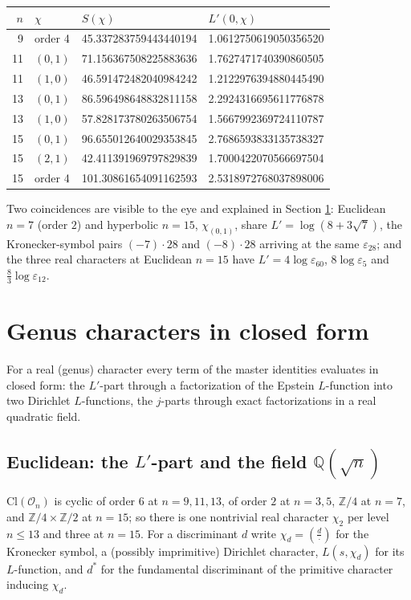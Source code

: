 \documentclass[11pt]{amsart}
\numberwithin{equation}{section}
\theoremstyle{plain}
\theoremstyle{definition}
\theoremstyle{remark}
\newcommand{\Q}{\mathbb{Q}}
\newcommand{\Z}{\mathbb{Z}}
\newcommand{\Cl}{\mathrm{Cl}}
\newcommand{\Oc}{\mathcal{O}}
\newcommand{\eps}{\varepsilon}
\begin{document}
\begin{center}
\small
\begin{tabular}{@{}rlll@{}}
\toprule
$n$ & $\chi$ & $S(\chi)$ & $L'(0,\chi)$\\
\midrule
9 & order 4 & 45.337283759443440194 & 1.0612750619050356520\\
11 & $(0,1)$ & 71.156367508225883636 & 1.7627471740390860505\\
11 & $(1,0)$ & 46.591472482040984242 & 1.2122976394880445490\\
13 & $(0,1)$ & 86.596498648832811158 & 2.2924316695611776878\\
13 & $(1,0)$ & 57.828173780263506754 & 1.5667992369724110787\\
15 & $(0,1)$ & 96.655012640029353845 & 2.7686593833135738327\\
15 & $(2,1)$ & 42.411391969797829839 & 1.7000422070566697504\\
15 & order 4 & 101.30861654091162593 & 2.5318972768037898006\\
\bottomrule
\end{tabular}
\end{center}
Two coincidences are visible to the eye and explained in Section
\ref{sec:genus}: Euclidean $n = 7$ (order $2$) and hyperbolic $n = 15$,
$\chi_{(0,1)}$, share $L' = \log(8 + 3\sqrt7)$, the Kronecker-symbol
pairs $(-7)\cdot 28$ and $(-8)\cdot 28$ arriving at the same
$\eps_{28}$; and the three real characters at Euclidean $n = 15$ have
$L' = 4\log\eps_{60}$, $8\log\eps_5$ and $\tfrac83\log\eps_{12}$.

\section{Genus characters in closed form}\label{sec:genus}

For a real (genus) character every term of the master identities
evaluates in closed form: the $L'$-part through a factorization of the
Epstein $L$-function into two Dirichlet $L$-functions, the $j$-parts
through exact factorizations in a real quadratic field.

\subsection{Euclidean: the $L'$-part and the field $\Q(\sqrt n)$}
\label{subsec:genus-euc}

$\Cl(\Oc_n)$ is cyclic of order $6$ at $n = 9, 11, 13$, of order $2$ at
$n = 3, 5$, $\Z/4$ at $n = 7$, and $\Z/4\times\Z/2$ at $n = 15$; so there
is one nontrivial real character $\chi_2$ per level $n \le 13$ and three
at $n = 15$.  For a discriminant $d$ write $\chi_d = (\tfrac{d}{\cdot})$
for the Kronecker symbol, a (possibly imprimitive) Dirichlet character,
$L(s,\chi_d)$ for its $L$-function, and $d^*$ for the fundamental
discriminant of the primitive character inducing $\chi_d$.
\end{document}
